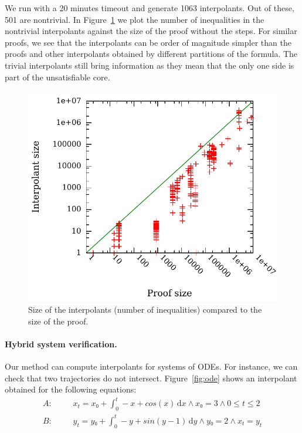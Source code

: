 
We run \dReal with a 20 minutes timeout and generate 1063 interpolants.
Out of these, 501 are nontrivial.
In Figure~\ref{fig:flyspeck} we plot the number of inequalities in the nontrivial interpolants against the size of the proof without the \weaken steps.
For similar proofs, we see that the interpolants can be order of magnitude simpler than the proofs and other interpolants obtained by different partitions of the formula.
The trivial interpolants still bring information as they mean that the only one side is part of the unsatisfiable core.


\begin{figure}
\centering
\includegraphics[scale=0.6]{img/itpsize2.pdf}
\caption{Size of the interpolants (number of inequalities) compared to the size of the proof.}
\label{fig:flyspeck}
\end{figure}


\paragraph{Hybrid system verification.}
Our method can compute interpolants for systems of ODEs.
For instance, we can check that two trajectories do not intersect.
Figure~\ref{fig:ode} shows an interpolant obtained for the following equations:
\begin{eqnarray*}
A: &~~~~&  x_t = x₀ + \int_0^t \! -x + cos(x) \, \mathrm{d}x ∧ x₀ = 3 ∧ 0 ≤ t ≤ 2 \\
B: &~~~~&  y_t = y₀ + \int_0^t \! -y + sin(y-1) \, \mathrm{d}y ∧ y₀ = 2 ∧ x_t = y_t
\end{eqnarray*}

